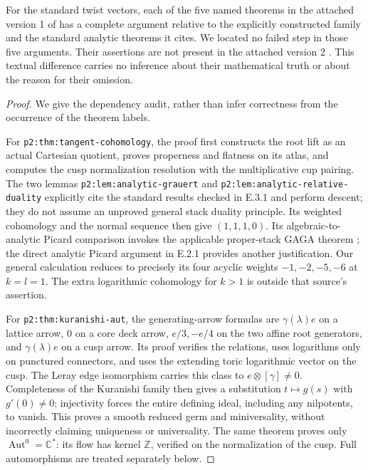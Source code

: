 \begin{proposition}
For the standard twist vectors, each of the five named theorems
in the attached version 1 of \cite{DGKXv1push} has a complete
argument relative to the explicitly constructed family and the
standard analytic theorems it cites.  We located no failed step
in those five arguments.  Their assertions are not present in
the attached version 2 \cite{DGKXv2push}.  This textual
difference carries no inference about their mathematical truth
or about the reason for their omission.
\end{proposition}
\begin{proof}
We give the dependency audit, rather than infer correctness from
the occurrence of the theorem labels.

For \texttt{p2:thm:tangent-cohomology}, the proof first constructs
the root lift as an actual Cartesian quotient, proves properness
and flatness on its atlas, and computes the cusp normalization
resolution with the multiplicative cup pairing.  The two lemmas
\texttt{p2:lem:analytic-grauert} and
\texttt{p2:lem:analytic-relative-duality} explicitly cite the
standard results checked in E.3.1 and perform descent; they do
not assume an unproved general stack duality principle.  Its
weighted cohomology and the normal sequence then give
$(1,1,1,0)$.  Its algebraic-to-analytic Picard comparison invokes
the applicable proper-stack GAGA theorem
\cite[Theorem 7.4]{PY16push}; the direct analytic Picard
argument in E.2.1 provides another justification.  Our general
calculation reduces to precisely its four acyclic weights
$-1,-2,-5,-6$ at $k=l=1$.  The extra logarithmic cohomology
for $k>1$ is outside that source's assertion.

For \texttt{p2:thm:kuranishi-aut}, the generating-arrow formulas
are $\gamma(\lambda)e$ on a lattice arrow, $0$ on a core deck
arrow, $e/3,-e/4$ on the two affine root generators, and
$\gamma(\lambda)e$ on a cusp arrow.  Its proof verifies the
relations, uses logarithms only on punctured connectors, and
uses the extending toric logarithmic vector on the cusp.
The Leray edge isomorphism carries this class to
$e\otimes[\gamma]\ne0$.  Completeness of the Kuranishi family
then gives a substitution $t\mapsto g(s)$ with $g'(0)\ne0$;
injectivity forces the entire defining ideal, including any
nilpotents, to vanish.  This proves a smooth reduced germ and
miniversality, without incorrectly claiming uniqueness or
universality.  The same theorem proves only
$\operatorname{Aut}^0=\mathbb C^*$: its flow has kernel
$\mathbb Z$, verified on the normalization of the cusp.  Full
automorphisms are treated separately below.


\end{proof}
